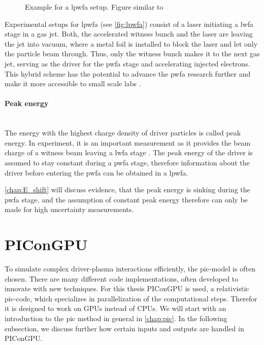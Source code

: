 \documentclass[bachelor_thesis]{subfiles}
\begin{document}
\begin{figure}
	\centering
	
	\caption{Example for a \gls{lpwfa} setup. Figure similar to \cite{Ossa2019}}
	\label{fig:lpwfa}
\end{figure} 
Experimental setups for \gls{lpwfa} (see \autoref{fig:lpwfa}) consist of a laser initiating a \gls{lwfa} stage in a gas jet. 
Both, the accelerated witness bunch and the laser are leaving the jet into vacuum, where a metal foil is installed to block the laser and let only the particle beam through. 
Thus, only the witness bunch makes it to the next gas jet, serving as the driver for the \gls{pwfa} stage and accelerating injected electrons.
This hybrid scheme has the potential to advance the \gls{pwfa} research further and make it more accessible to small scale labs \cite{Kurz2021}.

\paragraph*{Peak energy}\hspace{0pt} \\
The energy with the highest charge density of driver particles is called peak energy. In experiment, it is an important measurement as it provides the beam charge of a witness beam leaving a \gls{lwfa} stage \cite{Schoebel2022}.
The peak energy of the driver is assumed to stay constant during a \gls{pwfa} stage, therefore information about the driver before entering the \gls{pwfa} can be obtained in a \gls{lpwfa}.

\autoref{chap:E_shift} will discuss evidence, that the peak energy is sinking during the \gls{pwfa} stage, and the assumption of constant peak energy therefore can only be made for high uncertainty measurements.


\section{PIConGPU}
To simulate complex driver-plasma interactions efficiently, the \acrfull{pic}-model is often chosen. There are many different code implementations, often developed to innovate with new techniques. For this thesis PIConGPU \cite{PIConGPU2013, PICRepo} is used, 
a relativistic \gls{pic}-code, which specializes in parallelization of the computational steps. Therefor it is designed to work on GPUs instead of CPUs. We will start with an introduction to the \gls{pic} method in general in \autoref{chap:pic}.
In the following subsection, we discuss further how certain inputs and outputs are handled in PIConGPU.
\end{document}

